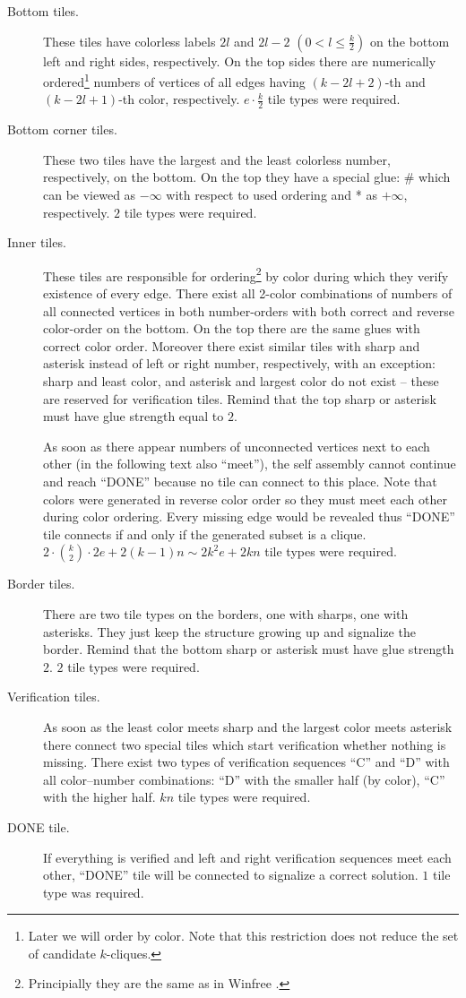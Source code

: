 \begin{description}
	\item[Bottom tiles.] These tiles have colorless labels $2l$ and $2l-2$ $(0 < l \leq \frac{k}{2})$ on the bottom left and right sides, respectively. On the top sides there are numerically ordered\footnote{Later we will order by color. Note that this restriction does not reduce the set of candidate $k$-cliques.} numbers of vertices of all edges having $(k-2l+2)$-th and $(k-2l+1)$-th color, respectively. $e\cdot \frac{k}{2}$ tile types were required.
	\item[Bottom corner tiles.] These two tiles have the largest and the least colorless number, respectively, on the bottom. On the top they have a special glue: \# which can be viewed as $-\infty$ with respect to used ordering and * as $+\infty$, respectively. $2$ tile types were required.
	\item[Inner tiles.] These tiles are responsible for ordering\footnote{Principially they are the same as in Winfree \cite{winfree_phd}.} by color during which they verify e\-xi\-stence of every edge. There exist all 2-color combinations of numbers of all connected vertices in both number-orders with both correct and reverse color-order on the bottom. On the top there are the same glues with correct color order. Moreover there exist similar tiles with sharp and asterisk instead of left or right number, respectively, with an exception: sharp and least color, and asterisk and largest color do not exist -- these are reserved for verification tiles. Remind that the top sharp or asterisk must have glue strength equal to $2$.
	
	As soon as there appear numbers of unconnected vertices next to each other (in the following text also ``meet''), the self assembly cannot continue and reach ``DONE'' because no tile can connect to this place. Note that colors were generated in reverse color order so they must meet each other during color ordering. Every missing edge would be revealed thus ``DONE'' tile connects if and only if the generated subset is a clique. $2\cdot\binom{k}{2}\cdot 2e + 2(k-1)n \sim 2 k^2 e + 2kn$ tile types were required.
	\item[Border tiles.] There are two tile types on the borders, one with sharps, one with asterisks. They just keep the structure growing up and signalize the border. Remind that the bottom sharp or asterisk must have glue strength $2$. $2$ tile types were required.
	\item[Verification tiles.] As soon as the least color meets sharp and the largest color meets asterisk there connect two special tiles which start verification whether nothing is missing. There exist two types of verification sequences ``C'' and ``D'' with all color--number combinations: ``D'' with the smaller half (by color), ``C'' with the higher half. $kn$ tile types were required.
	\item[DONE tile.] If everything is verified and left and right verification sequences meet each other, ``DONE'' tile will be connected to signalize a correct solution. $1$ tile type was required.
\end{description}

